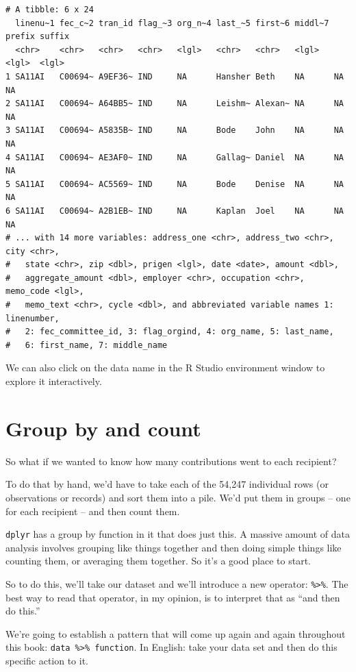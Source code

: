 \documentclass[
  letterpaper,
  DIV=11,
  numbers=noendperiod]{scrreprt}
\begin{document}
\begin{verbatim}
# A tibble: 6 x 24
  linenu~1 fec_c~2 tran_id flag_~3 org_n~4 last_~5 first~6 middl~7 prefix suffix
  <chr>    <chr>   <chr>   <chr>   <lgl>   <chr>   <chr>   <lgl>   <lgl>  <lgl> 
1 SA11AI   C00694~ A9EF36~ IND     NA      Hansher Beth    NA      NA     NA    
2 SA11AI   C00694~ A64BB5~ IND     NA      Leishm~ Alexan~ NA      NA     NA    
3 SA11AI   C00694~ A5835B~ IND     NA      Bode    John    NA      NA     NA    
4 SA11AI   C00694~ AE3AF0~ IND     NA      Gallag~ Daniel  NA      NA     NA    
5 SA11AI   C00694~ AC5569~ IND     NA      Bode    Denise  NA      NA     NA    
6 SA11AI   C00694~ A2B1EB~ IND     NA      Kaplan  Joel    NA      NA     NA    
# ... with 14 more variables: address_one <chr>, address_two <chr>, city <chr>,
#   state <chr>, zip <dbl>, prigen <lgl>, date <date>, amount <dbl>,
#   aggregate_amount <dbl>, employer <chr>, occupation <chr>, memo_code <lgl>,
#   memo_text <chr>, cycle <dbl>, and abbreviated variable names 1: linenumber,
#   2: fec_committee_id, 3: flag_orgind, 4: org_name, 5: last_name,
#   6: first_name, 7: middle_name
\end{verbatim}

We can also click on the data name in the R Studio environment window to
explore it interactively.

\hypertarget{group-by-and-count}{%
\section{Group by and count}\label{group-by-and-count}}

So what if we wanted to know how many contributions went to each
recipient?

To do that by hand, we'd have to take each of the 54,247 individual rows
(or observations or records) and sort them into a pile. We'd put them in
groups -- one for each recipient -- and then count them.

\texttt{dplyr} has a group by function in it that does just this. A
massive amount of data analysis involves grouping like things together
and then doing simple things like counting them, or averaging them
together. So it's a good place to start.

So to do this, we'll take our dataset and we'll introduce a new
operator: \texttt{\%\textgreater{}\%}. The best way to read that
operator, in my opinion, is to interpret that as ``and then do this.''

We're going to establish a pattern that will come up again and again
throughout this book: \texttt{data\ \%\textgreater{}\%\ function}. In
English: take your data set and then do this specific action to it.
\end{document}
